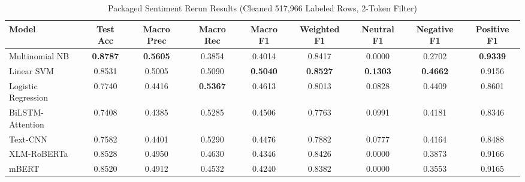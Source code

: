 \begin{table}[t]
\caption{Packaged Sentiment Rerun Results (Cleaned 517,966 Labeled Rows, 2-Token Filter)}
\label{tab:packaged-rerun-results}
\centering
\footnotesize
\setlength{\tabcolsep}{6pt}
\begin{tabular}{lcccccccc}
\toprule
Model & Test Acc & Macro Prec & Macro Rec & Macro F1 & Weighted F1 & Neutral F1 & Negative F1 & Positive F1 \\
\midrule
Multinomial NB      & \textbf{0.8787} & \textbf{0.5605} & 0.3854 & 0.4014 & 0.8417 & 0.0000 & 0.2702 & \textbf{0.9339} \\
Linear SVM          & 0.8531 & 0.5005 & 0.5090 & \textbf{0.5040} & \textbf{0.8527} & \textbf{0.1303} & \textbf{0.4662} & 0.9156 \\
Logistic Regression & 0.7740 & 0.4416 & \textbf{0.5367} & 0.4613 & 0.8013 & 0.0828 & 0.4409 & 0.8601 \\
BiLSTM-Attention    & 0.7408 & 0.4385 & 0.5285 & 0.4506 & 0.7763 & 0.0991 & 0.4181 & 0.8346 \\
Text-CNN            & 0.7582 & 0.4401 & 0.5290 & 0.4476 & 0.7882 & 0.0777 & 0.4164 & 0.8488 \\
XLM-RoBERTa         & 0.8528 & 0.4950 & 0.4630 & 0.4346 & 0.8426 & 0.0000 & 0.3873 & 0.9166 \\
mBERT               & 0.8520 & 0.4912 & 0.4532 & 0.4240 & 0.8382 & 0.0000 & 0.3553 & 0.9165 \\
\bottomrule
\end{tabular}
\end{table}

